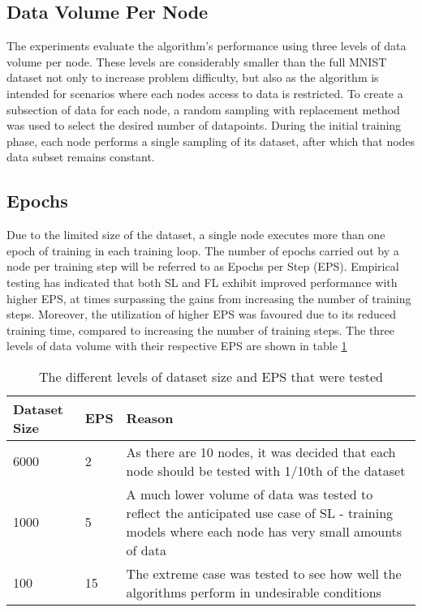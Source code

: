 \subsection{Data Volume Per Node}
The experiments evaluate the algorithm's performance using three levels of data volume per node. These levels are considerably smaller than the full MNIST dataset not only to increase problem difficulty, but also as the algorithm is intended for scenarios where each nodes access to data is restricted. To create a subsection of data for each node, a random sampling with replacement method was used to select the desired number of datapoints. During the initial training phase, each node performs a single sampling of its dataset, after which that nodes data subset remains constant.

\subsection{Epochs}
Due to the limited size of the dataset, a single node executes more than one epoch of training in each training loop. The number of epochs carried out by a node per training step will be referred to as Epochs per Step (EPS). Empirical testing has indicated that both SL and FL exhibit improved performance with higher EPS, at times surpassing the gains from increasing the number of training steps. Moreover, the utilization of higher EPS was favoured due to its reduced training time, compared to increasing the number of training steps. The three levels of data volume with their respective EPS are shown in table \ref{epsparams}

\begin{table}[H]
	\begin{tabular}{p{1.5cm}|l|p{10cm}}
		Dataset Size & EPS & Reason \\ \hline \hline
		6000  & 2  & As there are 10 nodes, it was decided that each node should be tested with 1/10th of the dataset \\ \hline
		1000   & 5   & A much lower volume of data was tested to reflect the anticipated use case of SL - training models where each node has very small amounts of data \\ \hline
		100  & 15  & The extreme case was tested to see how well the algorithms perform in undesirable conditions	\end{tabular}
	\caption{The different levels of dataset size and EPS that were tested} \label{epsparams}
\end{table}

